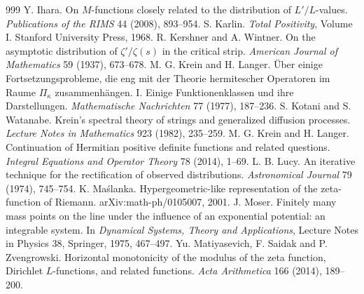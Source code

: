 \begin{thebibliography}{999}
 Y. Ihara. On $M$-functions closely related to the distribution of $L'/L$-values. \emph{Publications of the RIMS} 44 (2008), 893--954.
 S. Karlin. \emph{Total Positivity}, Volume I. Stanford University Press, 1968.
 R. Kershner and A. Wintner. On the asymptotic distribution of $\zeta'/\zeta(s)$ in the critical strip. \emph{American Journal of Mathematics} 59 (1937), 673--678.
 M. G. Krein and H. Langer. \"Uber einige Fortsetzungsprobleme, die eng mit der Theorie hermitescher Operatoren im Raume $\Pi_\kappa$ zusammenh\"angen. I. Einige Funktionenklassen und ihre Darstellungen. \emph{Mathematische Nachrichten} 77 (1977), 187--236.
 S. Kotani and S. Watanabe. Krein's spectral theory of strings and generalized diffusion processes. \emph{Lecture Notes in Mathematics} 923 (1982), 235--259.
 M. G. Krein and H. Langer. Continuation of Hermitian positive definite functions and related questions. \emph{Integral Equations and Operator Theory} 78 (2014), 1--69.
 L. B. Lucy. An iterative technique for the rectification of observed distributions. \emph{Astronomical Journal} 79 (1974), 745--754.
 K. Ma\'slanka. Hypergeometric-like representation of the zeta-function of Riemann. arXiv:math-ph/0105007, 2001.
 J. Moser. Finitely many mass points on the line under the influence of an exponential potential: an integrable system. In \emph{Dynamical Systems, Theory and Applications}, Lecture Notes in Physics 38, Springer, 1975, 467--497.
 Yu. Matiyasevich, F. Saidak and P. Zvengrowski. Horizontal monotonicity of the modulus of the zeta function, Dirichlet $L$-functions, and related functions. \emph{Acta Arithmetica} 166 (2014), 189--200.

\end{thebibliography}

